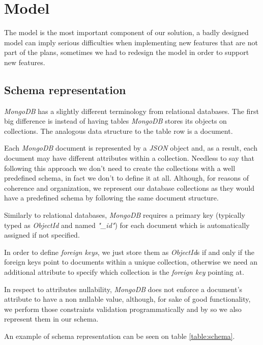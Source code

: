 \section{Model}
The model is the most important component of our solution, a badly designed model can imply serious difficulties when implementing new features that are not part of the plans, sometimes we had to redesign the model in order to support new features.

\subsection {Schema representation}
    \emph{MongoDB} has a slightly different terminology from relational databases. The first big difference is instead of having tables \emph{MongoDB} stores its objects on collections. The analogous data structure to the table row is a document.

    Each \emph{MongoDB} document is represented by a \emph{JSON} object and, as a result, each document may have different attributes within a collection. Needless to say that following this approach we don't need to create the collections with a well predefined schema, in fact we don't to define it at all. Although, for reasons of coherence and organization, we represent our database collections as they would have a predefined schema by following the same document structure.

    Similarly to relational databases, \emph{MongoDB} requires a primary key (typically typed as \emph{ObjectId} and named \emph{"\_id"}) for each document which is automatically assigned if not specified. 

    In order to define \emph{foreign keys}, we just store them as \emph{ObjectId}s if and only if the foreign keys point to documents within a unique collection, otherwise we need an additional attribute to specify which collection is the \emph{foreign key} pointing at.

    In respect to attributes nullability, \emph{MongoDB} does not enforce a document's attribute to have a non nullable value, although, for sake of good functionality, we perform those constraints validation programmatically and by so we also represent them in our schema.

    An example of schema representation can be seen on table \ref{table:schema}.


